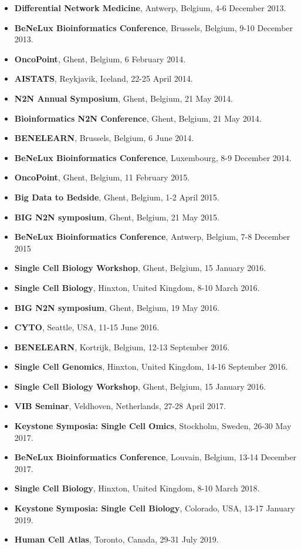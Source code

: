 \begin{itemize}
  \item \textbf{Differential Network Medicine}, Antwerp, Belgium, 4-6 December 2013.
  \item \textbf{BeNeLux Bioinformatics Conference}, Brussels, Belgium, 9-10 December 2013.
  \item \textbf{OncoPoint}, Ghent, Belgium, 6 February 2014.
  \item \textbf{AISTATS}, Reykjavik, Iceland, 22-25 April 2014.
  \item \textbf{N2N Annual Symposium}, Ghent, Belgium, 21 May 2014.
  \item \textbf{Bioinformatics N2N Conference}, Ghent, Belgium, 21 May 2014.
  \item \textbf{BENELEARN}, Brussels, Belgium, 6 June 2014.
  \item \textbf{BeNeLux Bioinformatics Conference}, Luxembourg, 8-9 December 2014.
  \item \textbf{OncoPoint}, Ghent, Belgium, 11 February 2015.
  \item \textbf{Big Data to Bedside}, Ghent, Belgium, 1-2 April 2015.
  \item \textbf{BIG N2N symposium}, Ghent, Belgium, 21 May 2015.
  \item \textbf{BeNeLux Bioinformatics Conference}, Antwerp, Belgium, 7-8 December 2015
  \item \textbf{Single Cell Biology Workshop}, Ghent, Belgium, 15 January 2016.
  \item \textbf{Single Cell Biology}, Hinxton, United Kingdom, 8-10 March 2016.
  \item \textbf{BIG N2N symposium}, Ghent, Belgium, 19 May 2016.
  \item \textbf{CYTO}, Seattle, USA, 11-15 June 2016.
  \item \textbf{BENELEARN}, Kortrijk, Belgium, 12-13 September 2016.
  \item \textbf{Single Cell Genomics}, Hinxton, United Kingdom, 14-16 September 2016.
  \item \textbf{Single Cell Biology Workshop}, Ghent, Belgium, 15 January 2016.
  \item \textbf{VIB Seminar}, Veldhoven, Netherlands, 27-28 April 2017.
  \item \textbf{Keystone Symposia: Single Cell Omics}, Stockholm, Sweden, 26-30 May 2017. 
  \item \textbf{BeNeLux Bioinformatics Conference}, Louvain, Belgium, 13-14 December 2017.
  \item \textbf{Single Cell Biology}, Hinxton, United Kingdom, 8-10 March 2018.
  \item \textbf{Keystone Symposia: Single Cell Biology}, Colorado, USA, 13-17 January 2019.
  \item \textbf{Human Cell Atlas}, Toronto, Canada, 29-31 July 2019.
\end{itemize}

